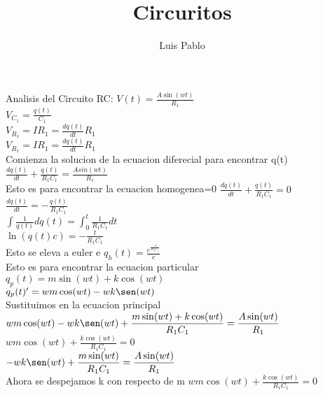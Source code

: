 \documentclass[12pt]{article}
\title{Circuritos}
\author{Luis Pablo}
\newcommand{\derivada}[2]{\displaystyle{\frac{d#1}{d#2}}}
\newcommand{\e}[1]{e^{#1}}
\newcommand{\integral}[4]{\displaystyle{\int_{#1}^{#2}{#3}{#4}}}
\newcommand{\escribir}[1]{\singlespacing#1\singlespacing}
\newcommand{\fraccion}[2]{\displaystyle{\frac{#1}{#2}}}
\begin{document}
\maketitle

	\escribir{Analisis del Circuito RC:}
	$V(t)=\fraccion{A\sin(wt)}{R_1}$\\

	$V_{C_1}=\fraccion{q(t)}{C_1} $\\

	$V_{R_1}=IR_1=\derivada{q(t)}{t}R_1$\\

	$V_{R_1}=IR_1=\derivada{q(t)}{t}R_1$\\

	\escribir{Comienza la solucion de la ecuacion diferecial para encontrar q(t)}
	$\derivada{q(t)}{t}+\fraccion{q(t)}{R_1C_1}=\fraccion{Asin(wt)}{R_1}$\\

	\escribir{Esto es para encontrar la ecuacion homogenea=0}
	$\derivada{q(t)}{t}+\fraccion{q(t)}{R_1C_1}=0$\\

	$\derivada{q(t)}{t}=-\fraccion{q(t)}{R_1C_1}$\\

	$\displaystyle\int{\fraccion{1}{q(t)}}{dq(t)}=\integral{0}{t}{\fraccion{1}{R_1C_1}}{dt}$\\

	$\ln (q(t)c)=-\fraccion{t}{R_1C_1}$\\

	\escribir{Esto se eleva a euler e}
	$q_{h}(t)=\fraccion{\e{\frac{-t}{R_1C_1}}}{c}$\\

	\escribir{Esto es para encontrar la ecuacion particular}
	$q_{p}(t)=m\sin(wt)+k\cos(wt)$\\

	$q_{p}(t)'=wm\cos(wt)-wk\sen(wt)$\\

	\escribir{Sustituimos en la ecuacion principal}
	$wm\cos(wt)-wk\sen(wt)+\fraccion{m\sin(wt)+k\cos(wt)}{R_1C_1}=\fraccion{A\sin(wt)}{R_1}$\\

	$wm\cos(wt)+\fraccion{k\cos(wt)}{R_1C_1}=0$\\

	$-wk\sen(wt)+\fraccion{m\sin(wt)}{R_1C_1}=\fraccion{A\sin(wt)}{R_1}$\\
	
	\escribir{Ahora se despejamos k con respecto de m}
	$wm\cos(wt)+\fraccion{k\cos(wt)}{R_1C_1}=0$\\
\end{document}

